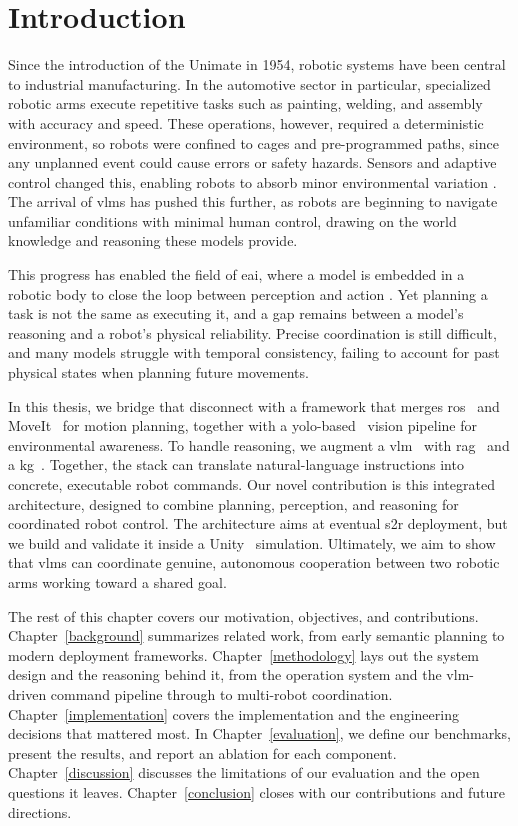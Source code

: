 \documentclass[
     12pt,
     a4paper,
     BCOR=10mm,
     DIV=14,
     listof=totoc,
     bibliography=totoc,
     parskip,
     twoside,
     headsepline
     ]{scrreprt}
\begin{document}
\chapter{Introduction}\label{intro}
Since the introduction of the Unimate in 1954, robotic systems have been central to industrial manufacturing. In the automotive sector in particular, specialized robotic arms execute repetitive tasks such as painting, welding, and assembly with accuracy and speed. These operations, however, required a deterministic environment, so robots were confined to cages and pre-programmed paths, since any unplanned event could cause errors or safety hazards. Sensors and adaptive control changed this, enabling robots to absorb minor environmental variation \cite{Li2020}. The arrival of \gls{vlm}s has pushed this further, as robots are beginning to navigate unfamiliar conditions with minimal human control, drawing on the world knowledge and reasoning these models provide.

This progress has enabled the field of \gls{eai}, where a model is embedded in a robotic body to close the loop between perception and action \cite{liu2025aligningcyberspacephysical}. Yet planning a task is not the same as executing it, and a gap remains between a model's reasoning and a robot's physical reliability. Precise coordination is still difficult, and many models struggle with temporal consistency, failing to account for past physical states when planning future movements.

In this thesis, we bridge that disconnect with a framework that merges \gls{ros}~\cite{Macenski_2022} and MoveIt~\cite{coleman2014reducingbarrierentrycomplex} for motion planning, together with a \gls{yolo}-based~\cite{yolov8_ultralytics} vision pipeline for environmental awareness. To handle reasoning, we augment a \gls{vlm}~\cite{mistral_magistral_small_2025} with \gls{rag}~\cite{lewis2021retrievalaugmentedgenerationknowledgeintensivenlp} and a \gls{kg}~\cite{Hogan_2021}. Together, the stack can translate natural-language instructions into concrete, executable robot commands. Our novel contribution is this integrated architecture, designed to combine planning, perception, and reasoning for coordinated robot control. The architecture aims at eventual \gls{s2r} deployment, but we build and validate it inside a Unity~\cite{unity} simulation. Ultimately, we aim to show that \gls{vlm}s can coordinate genuine, autonomous cooperation between two robotic arms working toward a shared goal.

The rest of this chapter covers our motivation, objectives, and contributions. Chapter~\ref{background} summarizes related work, from early semantic planning to modern deployment frameworks. Chapter~\ref{methodology} lays out the system design and the reasoning behind it, from the operation system and the \gls{vlm}-driven command pipeline through to multi-robot coordination. Chapter~\ref{implementation} covers the implementation and the engineering decisions that mattered most. In Chapter~\ref{evaluation}, we define our benchmarks, present the results, and report an ablation for each component. Chapter~\ref{discussion} discusses the limitations of our evaluation and the open questions it leaves. Chapter~\ref{conclusion} closes with our contributions and future directions.
\end{document}
